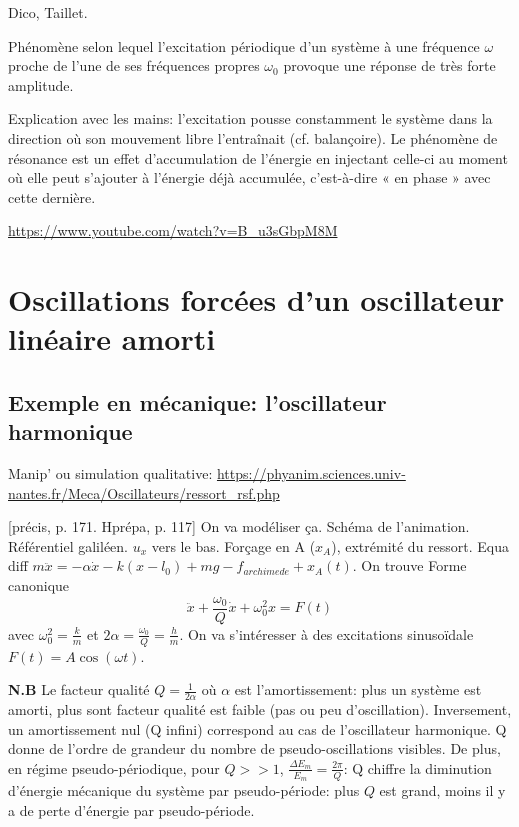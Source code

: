 \documentclass[11pt]{report}
\numberwithin{figure}{section}
\numberwithin{equation}{section}
\numberwithin{table}{section}
\newcommand{\1}{\boldsymbol{1}}
\begin{document}
\textcolor{mycolor5}{Dico, Taillet.}

Phénomène selon lequel l'excitation périodique d'un système à une fréquence $\omega$ proche de l'une de ses fréquences propres $\omega_0$  provoque une réponse de très forte amplitude.

Explication avec les mains: l'excitation pousse constamment le système dans la direction où son mouvement libre l'entraînait (cf. balançoire). Le phénomène de résonance est un effet d'accumulation de l'énergie en injectant celle-ci au moment où elle peut s'ajouter à l'énergie déjà accumulée, c'est-à-dire « en phase » avec cette dernière.

\url{https://www.youtube.com/watch?v=B_u3sGbpM8M}

\section{Oscillations forcées d'un oscillateur linéaire amorti}


\subsection{Exemple en mécanique: l'oscillateur harmonique}


\textcolor{mycolor5}{Manip' ou simulation qualitative: \url{https://phyanim.sciences.univ-nantes.fr/Meca/Oscillateurs/ressort_rsf.php}}

[précis, p. 171. Hprépa, p. 117] On va modéliser ça. Schéma de l'animation. Référentiel galiléen. $u_x$ vers le bas. Forçage en A ($x_A$), extrémité du ressort. Equa diff $m \ddot{x} = - \alpha \dot{x} - k (x - l_0) + mg - f_{archimede} + x_A(t)$. On trouve
Forme canonique
\begin{equation}
\ddot{x} + \frac{\omega_0}{Q} \dot{x} + \omega_0^2 x = F(t)
\end{equation}
avec $\omega_0^2 = \frac{k}{m}$ et $2\alpha = \frac{\omega_0}{Q} = \frac{h}{m}$.
On va s'intéresser à des excitations sinusoïdale $F(t) = A \cos (\omega t)$.

\textbf{N.B} Le facteur qualité $Q = \frac{1}{2 \alpha}$ où $\alpha$ est l'amortissement: plus un système est amorti, plus sont facteur qualité est faible (pas ou peu d'oscillation). Inversement, un amortissement nul (Q infini) correspond au cas de l'oscillateur harmonique. Q donne de l'ordre de grandeur du nombre de pseudo-oscillations visibles. De plus, en régime pseudo-périodique, pour $Q >> 1$, $\frac{\Delta E_m}{E_m} = \frac{2\pi}{Q}$: Q chiffre la diminution d'énergie mécanique du système par pseudo-période: plus $Q$ est grand, moins il y a de perte d'énergie par pseudo-période.
\end{document}
